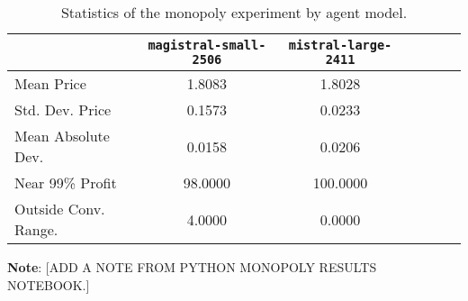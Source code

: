 \begin{table}[H]
\centering
\caption{Statistics of the monopoly experiment by agent model.}
\label{tab:monopoly_stats}
\begin{tabular}{lcccccc}
\toprule
 & \texttt{magistral-small-2506} & \texttt{mistral-large-2411} \\
\midrule
Mean Price & 1.8083 & 1.8028 \\
Std. Dev. Price & 0.1573 & 0.0233 \\
Mean Absolute Dev. & 0.0158 & 0.0206 \\
Near 99\% Profit & 98.0000 & 100.0000 \\
Outside Conv. Range. & 4.0000 & 0.0000 \\
\bottomrule
\end{tabular}
\vspace{0.5em}
\footnotesize{\parbox{1\textwidth}{\textbf{Note}: [ADD A NOTE FROM PYTHON MONOPOLY RESULTS NOTEBOOK.]}}

\end{table}
